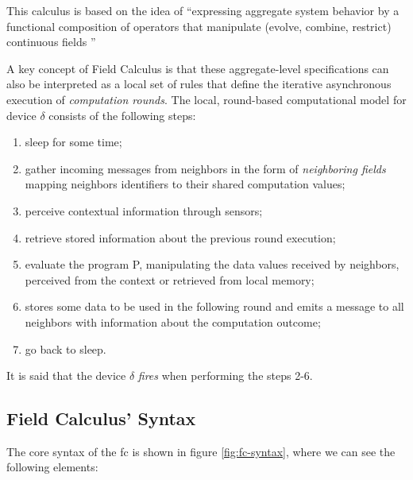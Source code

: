 This calculus is based on the idea of ``expressing aggregate system behavior by a functional composition of operators that manipulate (evolve, combine, restrict) continuous fields \cite{10.1007/978-3-642-45364-9_11}''

A key concept of Field Calculus is that these aggregate-level specifications can also be interpreted as a local set of rules that define the iterative asynchronous execution of \textit{computation rounds}.
The local, round-based computational model for device $\delta$ consists of the following steps:

\begin{enumerate}
    \item sleep for some time;
    \item gather incoming messages from neighbors in the form of \textit{neighboring fields} mapping neighbors identifiers to their shared computation values;
    \item perceive contextual information through sensors;
    \item retrieve stored information about the previous round execution;
    \item evaluate the program P, manipulating the data values received by neighbors, perceived from the context or retrieved from local memory;
    \item stores some data to be used in the following round and emits a message to all neighbors with information about the computation outcome;
    \item go back to sleep.
\end{enumerate}

It is said that the device $\delta$ \textit{fires} when performing the steps 2-6.

\subsection{Field Calculus' Syntax}
\label{subsec:fc-syntax}
The core syntax of the \ac{fc} is shown in figure \ref{fig:fc-syntax}, where we can see the following elements:

